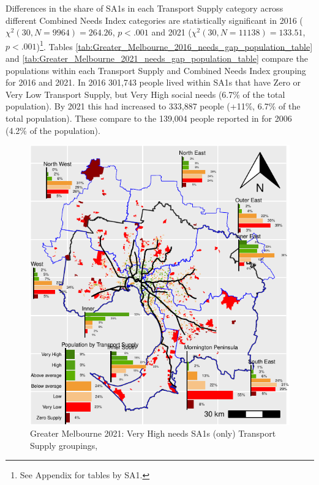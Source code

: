 \documentclass[preprint, 3p,
authoryear]{elsarticle} %
\begin{document}
Differences in the share of SA1s in each Transport Supply category
across different Combined Needs Index categories are statistically
significant in 2016 (\(\chi^2(30, N = 9964) = 264.26\), \(p < .001\) and
2021 (\(\chi^2(30, N = 11138) = 133.51\), \(p < .001\))\footnote{See
  Appendix for tables by SA1.}. Tables
\ref{tab:Greater_Melbourne_2016_needs_gap_population_table} and
\ref{tab:Greater_Melbourne_2021_needs_gap_population_table} compare the
populations within each Transport Supply and Combined Needs Index
grouping for 2016 and 2021. In 2016 301,743 people lived within SA1s
that have Zero or Very Low Transport Supply, but Very High social needs
(6.7\% of the total population). By 2021 this had increased to 333,887
people (+11\%, 6.7\% of the total population). These compare to the
139,004 people reported in \citet{currie2010identifying} for 2006 (4.2\%
of the population).

\begin{figure}
\includegraphics[width=1\linewidth]{ReynoldsCurrieQu2024_files/figure-latex/Greater_Melbourne_2021_needs_gap_map_figure-1} \caption{Greater Melbourne 2021: Very High needs SA1s (only) Transport Supply groupings,}\label{fig:Greater_Melbourne_2021_needs_gap_map_figure}
\end{figure}
\end{document}
